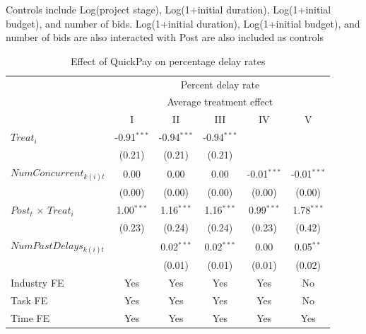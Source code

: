 \documentclass[
]{article}
\begin{document}
\begin{table}[htbp]
   \par \raggedright 
   Controls include Log(project stage), Log(1+initial duration), Log(1+initial budget), and number of bids. Log(1+initial duration), Log(1+initial budget), and number of bids are also interacted with Post are also included as controls
\end{table}
\begin{table}[htbp]
   \caption{Effect of QuickPay on percentage delay rates}
   \centering
   \small
   \begin{tabular}{lccccc}
      \toprule
       & \multicolumn{5}{c}{Percent delay rate}\\
       & \multicolumn{5}{c}{Average treatment effect} \\ 
                                   & I             & II            & III           & IV            & V\\  
      \midrule 
      $Treat_i$                    & -0.91$^{***}$ & -0.94$^{***}$ & -0.94$^{***}$ &               &   \\   
                                   & (0.21)        & (0.21)        & (0.21)        &               &   \\   
      $NumConcurrent_{k(i)t}$      & 0.00          & 0.00          & 0.00          & -0.01$^{***}$ & -0.01$^{***}$\\   
                                   & (0.00)        & (0.00)        & (0.00)        & (0.00)        & (0.00)\\   
      $Post_t$ $\times$ $Treat_i$  & 1.00$^{***}$  & 1.16$^{***}$  & 1.16$^{***}$  & 0.99$^{***}$  & 1.78$^{***}$\\   
                                   & (0.23)        & (0.24)        & (0.24)        & (0.23)        & (0.42)\\   
      $NumPastDelays_{k(i)t}$      &               & 0.02$^{***}$  & 0.02$^{***}$  & 0.00          & 0.05$^{**}$\\   
                                   &               & (0.01)        & (0.01)        & (0.01)        & (0.02)\\   
      \midrule 
      Industry FE                  & Yes           & Yes           & Yes           & Yes           & No\\  
      Task FE                      & Yes           & Yes           & Yes           & Yes           & No\\  
      Time FE                      & Yes           & Yes           & Yes           & Yes           & Yes\\  

\end{tabular}
\end{table}
\end{document}
